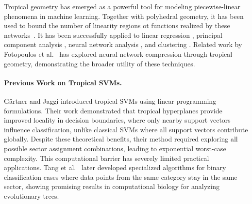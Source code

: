 \documentclass{article}
\begin{document}
Tropical geometry has emerged as a powerful tool for modeling piecewise-linear phenomena in machine learning. Together with polyhedral geometry,
it has been used to bound the number of linearity regions ot functions realized by these networks~\cite{zhang2018,montufar}.
It has been successfully applied to linear regression \cite{maragos2020,akian2020}, principal component analysis \cite{yoshida2019}, neural network analysis \cite{maragos2021}, and clustering \cite{monod2022}. Related work by Fotopoulos et al.~\cite{fotopoulos2024} has explored neural network compression through tropical geometry, demonstrating the broader utility of these techniques.

\paragraph{Previous Work on Tropical SVMs.} Gärtner and Jaggi \cite{gartner2008} introduced tropical SVMs using linear programming formulations. Their work demonstrated that tropical hyperplanes provide improved locality in decision boundaries, where only nearby support vectors influence classification, unlike classical SVMs where all support vectors contribute globally. Despite these theoretical benefits, their method required exploring all possible sector assignment combinations, leading to exponential worst-case complexity. This computational barrier has severely limited practical applications. Tang et al.~\cite{tang2020} later developed specialized algorithms for binary classification cases where data points from the same category stay in the same sector, showing promising results in computational biology for analyzing evolutionary trees.
\end{document}
